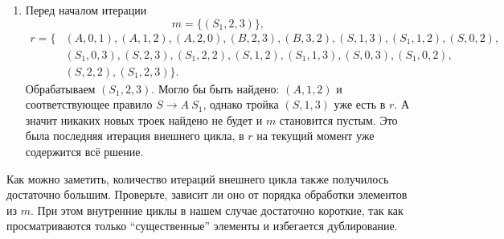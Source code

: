 \begin{example}
\begin{enumerate}
   \item
   Перед началом итерации 
     $$
     m = \{(S_1, 2, 3)\},
     $$ 
     \begin{align*}
     r= \{&(A,0,1),(A,1,2),(A,2,0),(B,2,3),(B,3,2),(S,1,3),(S_1, 1, 2),(S, 0, 2),\\
          &(S_1, 0, 3),(S, 2, 3),(S_1, 2, 2),(S, 1, 2),(S_1, 1, 3),(S, 0, 3),(S_1, 0, 2),\\
          &(S, 2, 2),(S_1, 2, 3)\}.
     \end{align*}
     Обрабатываем $(S_1, 2, 3)$. 
     Могло бы быть найдено: $(A,1,2)$ и соответствующее правило $S \to A \ S_1$, однако тройка $(S, 1, 3)$ уже есть в $r$. 
     А значит никаких новых троек найдено не будет и $m$ становится пустым.
     Это была последняя итерация внешнего цикла, в $r$ на текущий момент уже содержится всё ршение. 

  \end{enumerate}

\end{example}

Как можно заметить, количество итераций внешнего цикла также получилось достаточно большим. 
Проверьте, зависит ли оно от порядка обработки элементов из $m$.
При этом внутренние циклы в нашем случае достаточно короткие, так как просматриваются только ``существенные'' элементы и избегается дублирование.

